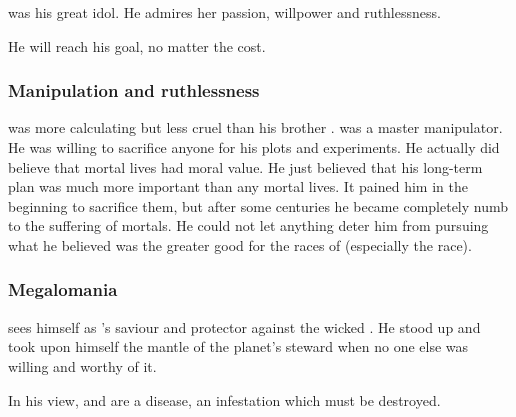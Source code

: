 \TyarithXserasshana{} was his great idol. 
He admires her passion, willpower and ruthlessness. 


He will reach his goal, no matter the cost.






\subsubsection{Manipulation and ruthlessness}
\Secherdamon was more calculating but less cruel than his brother \Iscrafel. 
\Secherdamon was a master manipulator.
He was willing to sacrifice anyone for his plots and experiments. 
He actually did believe that mortal lives had moral value.
He just believed that his long-term plan was much more important than any mortal lives. 
It pained him in the beginning to sacrifice them, but after some centuries he became completely numb to the suffering of mortals. 
He could not let anything deter him from pursuing what he believed was the greater good for the races of \Miith (especially the \draconian race). 




\subsubsection{Megalomania}
\Secherdamon{} sees himself as \Miith{}'s saviour and protector against the wicked \banes. He stood up and took upon himself the mantle of the planet's steward when no one else was willing and worthy of it. 

In his view, \resphain{} and \humans{} are a disease, an infestation which must be destroyed. 


